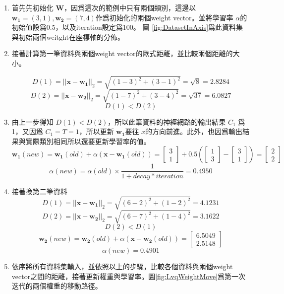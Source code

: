 \newpage
\begin{enumerate}
	\item
	      首先先初始化 \(\mathbf{W}\)，因爲這次的範例中只有兩個類別，這邊以 \(\mathbf{w_1}=(3,1),\mathbf{w_2}=(7,4)\)作爲初始化的兩個weight vector。並將學習率 \(\alpha\)的初始值設爲0.5，以及iteration設定爲100。
	      圖 \ref{fig:DatasetInAxis}爲此資料集與初始兩個weitght在座標軸的分佈。
	\item
	      接著計算第一筆資料與兩個weight vector的歐式距離，並比較兩個距離的大小。

	      $$D(1)=||\mathbf{x}-\mathbf{w_1}||_2 = \sqrt{(1-3)^2+(3-1)^2}=\sqrt{8}=2.8284 $$
	      $$D(2)=||\mathbf{x}-\mathbf{w_2}||_2 = \sqrt{(1-7)^2+(3-4)^2}=\sqrt{37}=6.0827 $$
	      $$D(1)<D(2)$$

	\item
	      由上一步得知 \(D(1)<D(2)\)，所以此筆資料的神經網路的輸出結果 \(C_1\) 爲1，又因爲 \(C_1 = T = 1\)，所以更新 \(\mathbf{w_1}\)要往 \(x\)的方向前進。此外，也因爲輸出結果與實際類別相同所以還要更新學習率的值。
	      $$\mathbf{w_1}(new) = \mathbf{w_1}(old) + \alpha(\mathbf{x-w_1}(old))= \begin{bmatrix}3\\ 1\end{bmatrix}+0.5(\begin{bmatrix}1\\ 3\end{bmatrix} - \begin{bmatrix}3\\ 1\end{bmatrix})= \begin{bmatrix}2\\ 2\end{bmatrix}  $$
	      $$\alpha(new) = \alpha(old)\times \frac{1}{1+decay*iteration} =0.4950$$

	\item
	      接著換第二筆資料
	      $$D(1)=||\mathbf{x}-\mathbf{w_1}||_2 = \sqrt{(6-2)^2+(1-2)^2}=4.1231 $$
	      $$D(2)=||\mathbf{x}-\mathbf{w_2}||_2 = \sqrt{(6-7)^2+(1-4)^2}=3.1622 $$
	      $$D(2)<D(1)$$
	      $$\mathbf{w_2}(new) = \mathbf{w_2}(old) + \alpha(\mathbf{x-w_2}(old))= \begin{bmatrix} 6.5049 \\ 2.5148 \end{bmatrix}  $$
	      $$\alpha(new) = 0.4901$$




	\item
		依序將所有資料集輸入，並依照以上的步驟，比較各個資料與兩個weight vector之間的距離，接著更新權重與學習率。圖\ref{fig:LvqWeightMove}爲第一次迭代的兩個權重的移動路徑。


\end{enumerate}
